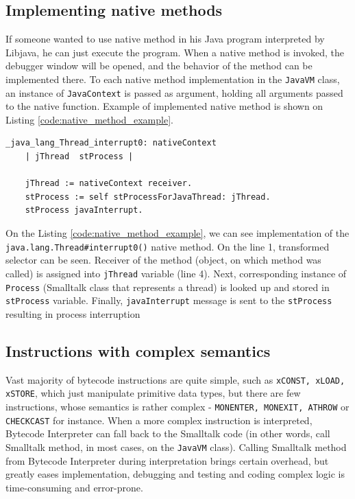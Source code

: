 \documentclass[11pt,twoside,a4paper]{book}
\newcommand{\libjava}{{Libjava}}
\begin{document}
\subsection{Implementing native methods}

If someone wanted to use native method in his Java program interpreted by \libjava{}, he can just execute the program.
When a native method is invoked, the debugger window will be opened, and the behavior of the method can be implemented there.
To each native method implementation in the \texttt{JavaVM} class, an instance of \texttt{JavaContext} is passed as argument,
holding all arguments passed to the native function. Example of implemented native method is shown on Listing \ref{code:native_method_example}.

\begin{lstlisting}[caption=Example of Java native method implementation, label=code:native_method_example]
_java_lang_Thread_interrupt0: nativeContext 
    | jThread  stProcess |

    jThread := nativeContext receiver.
    stProcess := self stProcessForJavaThread: jThread.
    stProcess javaInterrupt.
\end{lstlisting}

On the Listing \ref{code:native_method_example}, we can see implementation of the \texttt{java.lang.Thread\#interrupt0()} native method. 
On the line 1, transformed selector can be seen.
Receiver of the method (object, on which method was called) is assigned into \texttt{jThread} variable (line 4).
Next, corresponding instance of \texttt{Process} (Smalltalk class that represents a thread) is looked up and stored in \texttt{stProcess} variable.
Finally, \texttt{javaInterrupt} message is sent to the \texttt{stProcess} resulting in process interruption

\subsection{Instructions with complex semantics}

Vast majority of bytecode instructions are quite simple, such as \texttt{xCONST, xLOAD, xSTORE}, which just manipulate primitive data types, but there are few instructions, whose semantics is rather complex - \texttt{MONENTER, MONEXIT, ATHROW} or \texttt{CHECKCAST} for instance. 
When a more complex instruction is interpreted, Bytecode Interpreter can fall back to the Smalltalk code (in other words, call Smalltalk method, in most cases, on the \texttt{JavaVM} class).
Calling Smalltalk method from Bytecode Interpreter during interpretation brings certain overhead, but greatly eases implementation, debugging and testing and coding complex logic is time-consuming and error-prone. 
\end{document}
